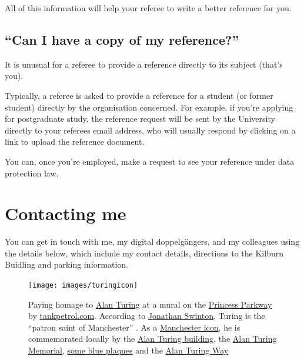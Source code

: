 \documentclass[
  12pt,
]{book}
\begin{document}
All of this information will help your referee to write a better reference for you.

\hypertarget{copy}{%
\section{``Can I have a copy of my reference?''}\label{copy}}

It is unusual for a referee to provide a reference directly to its subject (that's you).

Typically, a referee is asked to provide a reference for a student (or former student) directly by the organisation concerned. For example, if you're applying for postgraduate study, the reference request will be sent by the University directly to your referees email address, who will usually respond by clicking on a link to upload the reference document.

You can, once you're employed, make a request to see your reference under data protection law.

\hypertarget{contact}{%
\chapter{Contacting me}\label{contact}}

You can get in touch with me, my digital doppelgängers, and my colleagues using the details below, which include my contact details, directions to the Kilburn Buidling and parking information.



\begin{figure}

{\centering \texttt{[image: images/turingicon]} 

}

\caption{Paying homage to \href{https://en.wikipedia.org/wiki/Alan_Turing}{Alan Turing} at a mural on the \href{https://en.wikipedia.org/wiki/A5103_road}{Princess Parkway} by \href{http://tankpetrol.com/}{tankpetrol.com}. According to \href{https://www.manturing.net/jonathan}{Jonathan Swinton}, Turing is the ``patron saint of Manchester'' \citep{manturing}. As a \href{https://en.wikipedia.org/wiki/Symbols_of_Manchester}{Manchester icon}, he is commemorated locally by the \href{https://en.wikipedia.org/wiki/Alan_Turing_Building}{Alan Turing building}, the \href{https://en.wikipedia.org/wiki/Alan_Turing_Memorial}{Alan Turing Memorial}, \href{https://duncan.hull.name/2021/07/07/turings-house/}{some blue plaques} and the \href{https://www.google.com/maps/place/Alan+Turing+Way,+Manchester/}{Alan Turing Way} \citep{turingway}}\label{fig:unnamed-chunk-9}
\end{figure}
\end{document}
